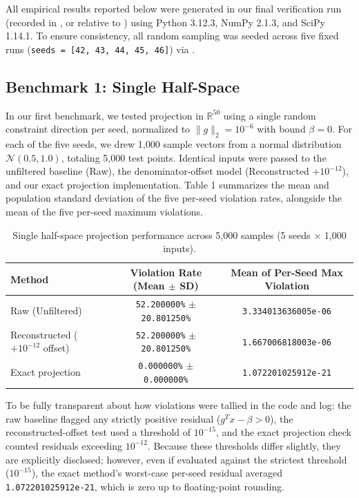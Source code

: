 \documentclass[11pt,a4paper]{article}
\begin{document}
All empirical results reported below were generated in our final verification run (recorded in , or  relative to ) using Python 3.12.3, NumPy 2.1.3, and SciPy 1.14.1. To ensure consistency, all random sampling was seeded across five fixed runs (\texttt{seeds = [42, 43, 44, 45, 46]}) via .

\subsection{Benchmark 1: Single Half-Space}
In our first benchmark, we tested projection in $\mathbb{R}^{50}$ using a single random constraint direction per seed, normalized to $\|g\|_2 = 10^{-6}$ with bound $\beta = 0$. For each of the five seeds, we drew 1,000 sample vectors from a normal distribution $\mathcal{N}(0.5, 1.0)$, totaling 5,000 test points. Identical inputs were passed to the unfiltered baseline (Raw), the denominator-offset model (Reconstructed $+10^{-12}$), and our exact projection implementation. Table 1 summarizes the mean and population standard deviation of the five per-seed violation rates, alongside the mean of the five per-seed maximum violations.

\begin{table}[h!]
\centering
\caption{Single half-space projection performance across 5,000 samples (5 seeds $\times$ 1,000 inputs).}
\vspace{0.4em}
\small
\begin{tabular}{@{}lcc@{}}
\toprule
\textbf{Method} & \textbf{Violation Rate (Mean $\pm$ SD)} & \textbf{Mean of Per-Seed Max Violation} \\
\midrule
Raw (Unfiltered) & \texttt{52.200000\%} $\pm$ \texttt{20.801250\%} & \texttt{3.334013636005e-06} \\
Reconstructed ($+10^{-12}$ offset) & \texttt{52.200000\%} $\pm$ \texttt{20.801250\%} & \texttt{1.667006818003e-06} \\
Exact projection & \texttt{0.000000\%} $\pm$ \texttt{0.000000\%} & \texttt{1.072201025912e-21} \\
\bottomrule
\end{tabular}
\end{table}

To be fully transparent about how violations were tallied in the code and log: the raw baseline flagged any strictly positive residual ($g^T x - \beta > 0$), the reconstructed-offset test used a threshold of $10^{-15}$, and the exact projection check counted residuals exceeding $10^{-12}$. Because these thresholds differ slightly, they are explicitly disclosed; however, even if evaluated against the strictest threshold ($10^{-15}$), the exact method's worst-case per-seed residual averaged \texttt{1.072201025912e-21}, which is zero up to floating-point rounding.
\end{document}
